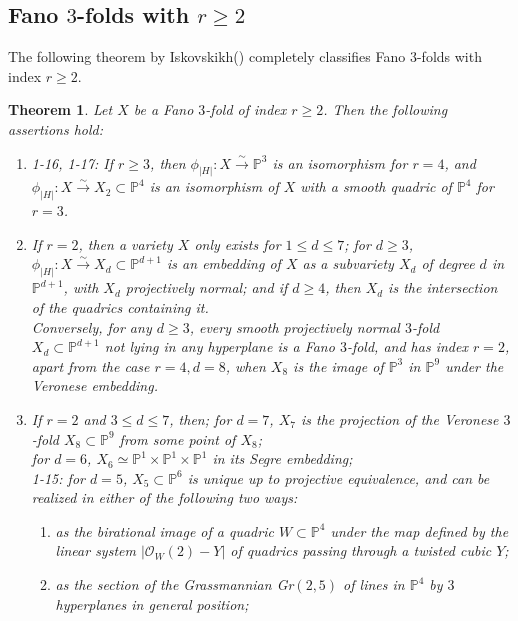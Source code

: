\documentclass[11pt]{amsart}
\theoremstyle{plain}
\newtheorem{theorem}{Theorem}[section]
\theoremstyle{definition}
\theoremstyle{expl}
\begin{document}
\subsection{Fano $3$-folds with $r\geq2$}
The following theorem by Iskovskikh(\cite{Isk77}) completely classifies Fano $3$-folds with index $r\geq 2$. 
\begin{theorem}
    Let $X$ be a Fano $3$-fold of index $r\geq 2$. Then the following assertions hold:
    \begin{enumerate}
        \item[(i)]1-16, 1-17: If $r\geq 3$, then $\phi_{|H|}: X \xrightarrow{\sim} \mathbb{P}^3$ is an isomorphism for $r=4$, and $\phi_{|H|}: X \xrightarrow{\sim} X_2\subset \mathbb{P}^4$ is an isomorphism of $X$ with a smooth quadric of $\mathbb{P}^4$ for $r=3$.
        \item[(ii)] If $r=2$, then a variety $X$ only exists for $1\leq d \leq 7$; for $d\geq 3$, $\phi_{|H|}: X \xrightarrow{\sim}X_d \subset \mathbb{P}^{d+1}$ is an embedding of $X$ as a subvariety $X_d$ of degree $d$ in $\mathbb{P}^{d+1}$, with $X_d$ projectively normal; and if $d\geq 4$, then $X_d$ is the intersection of the quadrics containing it. \\
        Conversely, for any $d\geq 3$, every smooth projectively normal $3$-fold $X_d \subset \mathbb{P}^{d+1}$ not lying in any hyperplane is a Fano $3$-fold, and has index $r=2$, apart from the case $r=4, d=8$, when $X_8$ is the image of $\mathbb{P}^3$ in $\mathbb{P}^9$ under the Veronese embedding.
        \item[(iii)] If $r=2$ and $3\leq d \leq 7$, then; for $d=7$, $X_7$ is the projection of the Veronese $3$-fold $X_8 \subset \mathbb{P}^9$ from some point of $X_8$; \\
        for $d=6$, $X_6 \simeq \mathbb{P}^1 \times \mathbb{P}^1\times \mathbb{P}^1$ in its Segre embedding;\\
        1-15: for $d=5$, $X_5 \subset \mathbb{P}^6$ is unique up to projective equivalence, and can be realized in either of the following two ways:
        \begin{enumerate}
            \item[(a)] as the birational image of a quadric $W \subset \mathbb{P}^4$ under the map defined by the linear system $|\mathcal{O}_W(2)-Y|$ of quadrics passing through a twisted cubic $Y$;
            \item[(b)] as the section of the Grassmannian Gr$(2,5)$ of lines in $\mathbb{P}^4$ by $3$ hyperplanes in general position;
        \end{enumerate}

\end{enumerate}
\end{theorem}
\end{document}
